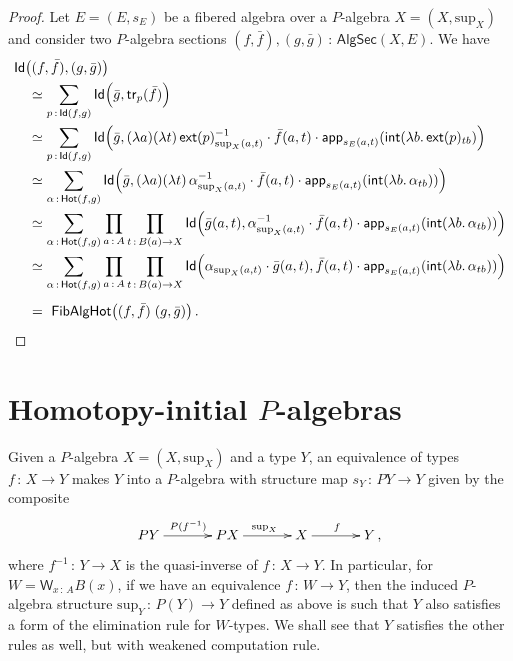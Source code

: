 \documentclass[10pt,a4paper,oneside,reqno]{amsart}
\theoremstyle{mythm}
\theoremstyle{mydef}
\theoremstyle{myrmk}
\newcommand{\co}{\,{:}\,}
\newcommand{\ct}{\cdot}
\newcommand{\trans}{\mathsf{tr}}
\newcommand{\Hot}{\mathsf{Hot}}
\newcommand{\ext}{\mathsf{ext}}
\renewcommand{\int}{\mathsf{int}}
\newcommand{\Id}{\mathsf{Id}}
\newcommand{\app}{\mathsf{app}}
\newcommand{\W}{\mathsf{W}}
\renewcommand{\sup}{\mathrm{sup}}
\newcommand{\FibAlgHot}{\mathsf{FibAlgHot}}
\newcommand{\PalgSec}{\mathsf{AlgSec}}
\begin{document}
\begin{proof}Let $E = (E, s_E)$ be a fibered algebra over a $P$-algebra $X = (X, \sup_X)$ and consider two $P$-algebra
sections $(f,\bar{f}), (g,\bar{g}) \co \PalgSec(X,E)$. We have
\begin{align*}
 & \Id\big( (f,\bar{f}),  (g,\bar{g}) \big) \\ 
& \quad \simeq \sum_{p \co \Id( f , g)} \Id \Big(\bar{g} , \trans_p ( \bar{f} ) \Big)  \\
& \quad \simeq \sum_{p \co \Id( f , g)} \Id \Big(\bar{g}, 
(\lambda a)(\lambda t) \, \ext(p)_{\sup_X(a,t)}^{-1} \ct \bar{f}(a,t) \ct \app_{s_E(a,t)}(\int (\lambda b . \, \ext(p)_{t  b})  \Big)  \\
& \quad \simeq \sum_{\alpha \co \Hot( f, g)} \Id \Big(\bar{g},  (\lambda a) (\lambda t) \, \alpha_{\sup_X(a,t)}^{-1} \ct \bar{f}(a,t) \ct 
\app_{s_E(a,t)} (\int (\lambda b. \,  \alpha_{t b}))  \Big)  \\
&\quad \simeq \sum_{\alpha \co \Hot( f, g)} \prod_{a \co A}\prod_{t \co B(a) \to X } \Id \Big(\bar{g}(a,t) , \alpha_{\sup_X(a,t)}^{-1} \ct \bar{f}(a,t) \ct \app_{s_E(a,t)}(\int (\lambda b. \, \alpha_{t  b})) \Big)  \\ 
& \quad \simeq \sum_{\alpha \co \Hot( f, g)} \prod_{a \co A}\prod_{t \co B(a) \to X } \Id \Big(\alpha_{\sup_X(a,t)} \ct \bar{g}(a,t) , \bar{f}(a,t) \ct 
\app_{s_E(a,t)}(\int  (\lambda b. \,  \alpha_{t  b})) \Big) \\[1ex]
& \quad = \  \FibAlgHot \big( (f,\bar{f}) \; (g,\bar{g}) \big) \, . \qedhere
\end{align*}  
\end{proof}


 

\section{Homotopy-initial $P$-algebras}

Given a $P$-algebra $X = (X, \sup_X)$ and a type $Y$, an equivalence of types $f \co X \to Y$ makes $Y$ into a $P$-algebra with structure map $s_Y \co PY \to Y$ given by the composite
\[
\xymatrix@C=1.2cm{
PY \ar[r]^{P(f^{-1})} & PX \ar[r]^{\sup_X} & X \ar[r]^f & Y \, , }
\]
 where $f^{-1} \co Y \to X$ is the quasi-inverse of $f \co X \to Y$. In particular, for $W = \W_{x \co A} B(x)$, if we have an equivalence  
 $f \co W \to Y$, then the induced $P$-algebra structure $\sup_Y \co P(Y)\to Y$ defined as above is such that $Y$ also satisfies 
 a form of the elimination rule for $W$-types.  We shall see that $Y$ satisfies the other rules as well, but with weakened computation rule.
\end{document}
